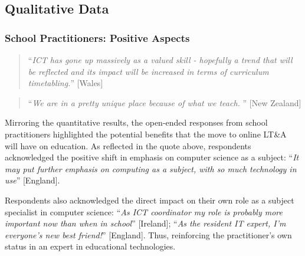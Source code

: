 \documentclass[sigconf]{acmart}
\begin{document}
\subsection{Qualitative Data}\label{qualdata}

\subsubsection{School Practitioners: Positive Aspects}

\begin{quotation}
``{\emph{ICT has gone up massively as a valued skill - hopefully a
    trend that will be reflected and its impact will be increased in
    terms of curriculum timetabling.}}'' [Wales]
\end{quotation}

\begin{quotation}
``{\emph{We are in a pretty unique place because of what we
teach. }}'' [New Zealand]
\end{quotation}



Mirroring the quantitative results, the open-ended responses from
school practitioners highlighted the potential benefits that the move
to online LT\&A will have on education. As reflected in the quote
above, respondents acknowledged the positive shift in emphasis on
computer science as a subject: ``{\emph{It may put further emphasis on
    computing as a subject, with so much technology in use}}'' [England].

Respondents also acknowledged the direct impact on their own role as a
subject specialist in computer science: ``{\emph{As ICT coordinator my
role is probably more important now than when in school}}'' [Ireland];
``{\emph{As the resident IT expert, I’m everyone’s new best
friend!}}'' [England]. Thus, reinforcing the practitioner’s own status
in an expert in educational technologies. 
\end{document}
